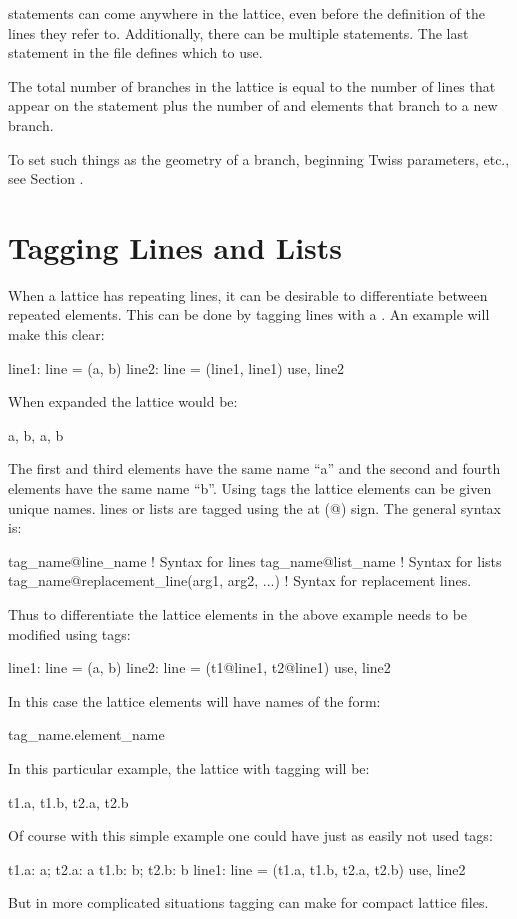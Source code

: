  statements can come anywhere in the lattice, even before the definition of the lines they
refer to. Additionally, there can be multiple  statements.  The last  statement in
the file defines which  to use.

The total number of branches in the lattice is equal to the number of lines that appear on the
 statement plus the number of  and  elements that branch to a new
branch.

To set such things as the geometry of a branch, beginning Twiss parameters, etc., see Section
.

\section{Tagging Lines and Lists}
\label{s:tag}

When a lattice has repeating lines, it can be desirable to differentiate
between repeated elements. This can be done by tagging lines with a . 
An example will make this clear:
\begin{example}
  line1: line = (a, b)
  line2: line = (line1, line1)
  use, line2
\end{example}
When expanded the lattice would be:
\begin{example}
  a, b, a, b
\end{example}
The first and third elements have the same name ``a'' and the second and fourth
elements have the same name ``b''. Using tags the lattice elements can be given
unique names. lines or lists are tagged  
using the at (@) sign. The general syntax is:
\begin{example}
  tag_name@line_name                           ! Syntax for lines
  tag_name@list_name                           ! Syntax for lists
  tag_name@replacement_line(arg1, arg2, ...)   ! Syntax for replacement lines.
\end{example}
Thus to differentiate the lattice elements in the above example  needs to
be modified using tags:
\begin{example}
  line1: line = (a, b)
  line2: line = (t1@line1, t2@line1)
  use, line2
\end{example}
In this case the lattice elements will have names of the form:
\begin{example}
  tag_name.element_name
\end{example}
In this particular example, the lattice with tagging will be:
\begin{example}
  t1.a, t1.b, t2.a, t2.b
\end{example}
Of course with this simple example one could have just as easily not used tags:
\begin{example}
  t1.a: a;   t2.a: a
  t1.b: b;   t2.b: b
  line1: line = (t1.a, t1.b, t2.a, t2.b)
  use, line2
\end{example}
But in more complicated situations tagging can make for compact lattice files.


